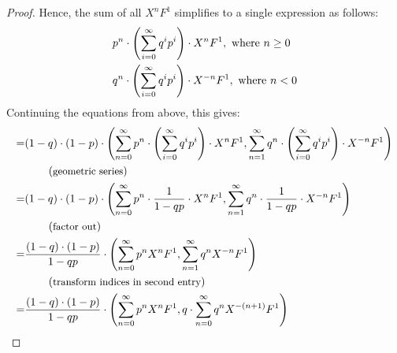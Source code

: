 \begin{lemma}
\begin{proof}
	Hence, the sum of all $X^n F^1$ simplifies to a single expression as follows:
	\begin{align*}
		& p^n \cdot \left(\sum_{i=0}^{\infty} q^i p^i\right) \cdot X^n F^1 , \text{ where } n \geq 0 \\
		& q^n \cdot \left(\sum_{i=0}^{\infty} q^i p^i\right) \cdot X^{-n} F^1 , \text{ where } n < 0
	\end{align*}
	Continuing the equations from above, this gives:
	\begin{align*}
		=& (1-q) \cdot (1-p) \cdot \left( 
			\sum_{n=0}^{\infty} p^n \cdot \left(\sum_{i=0}^{\infty} q^i p^i\right) \cdot X^n F^1,
			\sum_{n=1}^{\infty} q^n \cdot \left(\sum_{i=0}^{\infty} q^i p^i\right)
				\cdot X^{-n} F^1  \right) \\
		 & \hspace*{2em} \left(\text{\small geometric series}\right) \\
		=& (1-q) \cdot (1-p) \cdot \left( 
			\sum_{n=0}^{\infty} p^n \cdot \frac{1}{1-qp} \cdot X^n F^1,
			\sum_{n=1}^{\infty} q^n \cdot \frac{1}{1-qp} \cdot X^{-n} F^1  \right) \\
		 & \hspace*{2em} \left(\text{\small factor out}\right) \\
		=& \frac{(1-q) \cdot (1-p)}{1-qp} \cdot \left( 
			\sum_{n=0}^{\infty} p^n X^n F^1,
			\sum_{n=1}^{\infty} q^n X^{-n} F^1  \right) \\
		 & \hspace*{2em} \left(\text{\small transform indices in second entry}\right) \\
		=& \frac{(1-q) \cdot (1-p)}{1-qp} \cdot \left( 
			\sum_{n=0}^{\infty} p^n X^n F^1,
			q \cdot \sum_{n=0}^{\infty} q^n X^{-(n+1)} F^1  \right)
	\end{align*}
	\end{proof}
\end{lemma}


